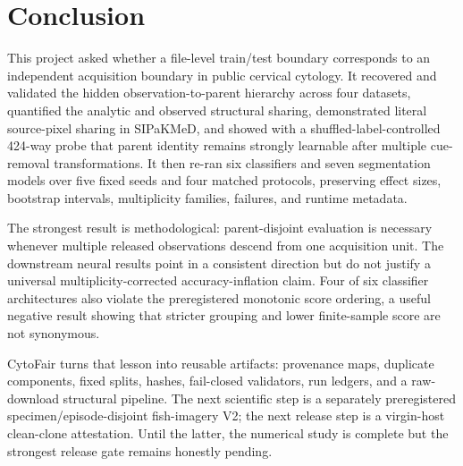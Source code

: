 \chapter{Conclusion}\label{s1:ch:ch18_conclusion}

This project asked whether a file-level train/test boundary corresponds to an independent acquisition boundary in public cervical cytology. It recovered and validated the hidden observation-to-parent hierarchy across four datasets, quantified the analytic and observed structural sharing, demonstrated literal source-pixel sharing in SIPaKMeD, and showed with a shuffled-label-controlled 424-way probe that parent identity remains strongly learnable after multiple cue-removal transformations. It then re-ran six classifiers and seven segmentation models over five fixed seeds and four matched protocols, preserving effect sizes, bootstrap intervals, multiplicity families, failures, and runtime metadata.

The strongest result is methodological: parent-disjoint evaluation is necessary whenever multiple released observations descend from one acquisition unit. The downstream neural results point in a consistent direction but do not justify a universal multiplicity-corrected accuracy-inflation claim. Four of six classifier architectures also violate the preregistered monotonic score ordering, a useful negative result showing that stricter grouping and lower finite-sample score are not synonymous.

CytoFair turns that lesson into reusable artifacts: provenance maps, duplicate components, fixed splits, hashes, fail-closed validators, run ledgers, and a raw-download structural pipeline. The next scientific step is a separately preregistered specimen/episode-disjoint fish-imagery V2; the next release step is a virgin-host clean-clone attestation. Until the latter, the numerical study is complete but the strongest release gate remains honestly pending.
